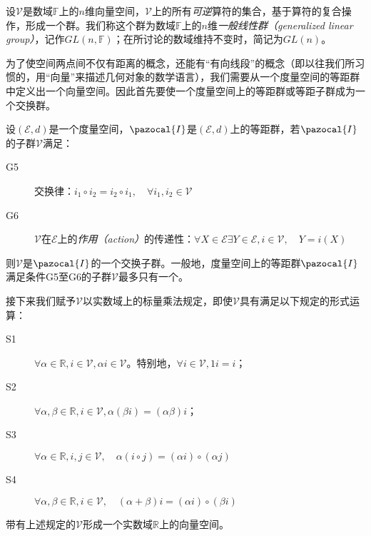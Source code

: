 \documentclass[main.tex]{subfiles}
\begin{document}
\begin{example}
    设$\mathcal{V}$是数域$\mathbb{F}$上的$n$维向量空间，$\mathcal{V}$上的所有\emph{可逆}算符的集合，基于算符的复合操作，形成一个群。我们称这个群为数域$\mathbb{F}$上的$n$维\emph{一般线性群（generalized linear group）}，记作$GL\left(n,\mathbb{F}\right)$；在所讨论的数域维持不变时，简记为$GL\left(n\right)$。
\end{example}

为了使空间两点间不仅有距离的概念，还能有“有向线段”的概念（即以往我们所习惯的，用“向量”来描述几何对象的数学语言），我们需要从一个度量空间的等距群中定义出一个向量空间。因此首先要使一个度量空间上的等距群或等距子群成为一个交换群。

设$\left(\mathcal{E},d\right)$是一个度量空间，$\pazocal{I}$是$\left(\mathcal{E},d\right)$上的等距群，若$\pazocal{I}$的子群$\mathcal{V}$满足：
\begin{description}
    \item[G5] 交换律：$i_1\circ i_2=i_2\circ i_1,\quad \forall i_1,i_2\in\mathcal{V}$
    \item[G6] $\mathcal{V}$在$\mathcal{E}$上的\emph{作用（action）}的传递性：$\forall X\in\mathcal{E}\exists Y\in\mathcal{E}, i\in\mathcal{V},\quad Y=i\left(X\right)$
\end{description}
则$\mathcal{V}$是$\pazocal{I}$的一个交换子群。一般地，度量空间上的等距群$\pazocal{I}$满足条件G5至G6的子群$\mathcal{V}$最多只有一个。

接下来我们赋予$\mathcal{V}$以实数域上的标量乘法规定，即使$\mathcal{V}$具有满足以下规定的形式运算：
\begin{description}
    \item[S1] $\forall\alpha\in\mathbb{R},i\in\mathcal{V},\alpha i\in\mathcal{V}$。特别地，$\forall i\in\mathcal{V},1i=i$；
    \item[S2] $\forall\alpha,\beta\in\mathbb{R},i\in\mathcal{V},\alpha\left(\beta i\right)=\left(\alpha\beta\right)i$；
    \item[S3] $\forall\alpha\in\mathbb{R},i,j\in\mathcal{V},\quad\alpha\left(i\circ j\right)=\left(\alpha i \right)\circ\left(\alpha j\right)$
    \item[S4] $\forall\alpha,\beta\in\mathbb{R},i\in\mathcal{V},\quad\left(\alpha+\beta\right)i=\left(\alpha i\right)\circ\left(\beta i\right)$
\end{description}
带有上述规定的$\mathcal{V}$形成一个实数域$\mathbb{R}$上的向量空间。
\end{document}
